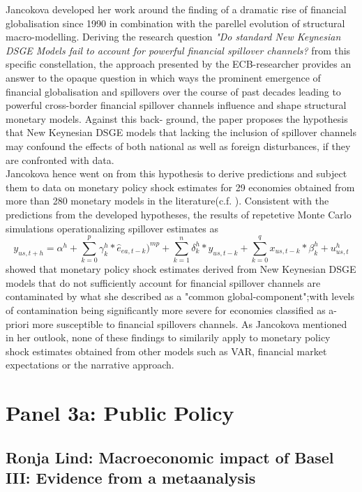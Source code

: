 \documentclass[a4paper,man,natbib]{apa6}
\begin{document}
Jancokova developed her work around the finding of a dramatic rise of financial globalisation since 1990 in combination with the parellel evolution of structural macro-modelling. Deriving the research question \textit{"Do standard New Keynesian DSGE Models fail to account for powerful financial spillover channels?} from this specific constellation, the approach presented by the ECB-researcher provides an answer to the opaque question in which ways the prominent emergence of financial globalisation and spillovers over the course of past decades leading to powerful cross-border financial spillover channels influence and shape structural monetary models. Against this back- ground, the paper proposes the hypothesis that New Keynesian DSGE models that lacking the inclusion of spillover channels may confound the effects of both national as well as foreign disturbances, if they are confronted with data. \\
Jancokova hence went on from this hypothesis to derive predictions and subject them to data on monetary policy shock estimates for 29 economies obtained from more than 280 monetary models in the literature(c.f. \cite{Georgiadis2017}). Consistent with the predictions from the developed hypotheses, the results of repetetive Monte Carlo simulations operationalizing spillover estimates as 
\begin{equation}
y_{us,t+h}  = \alpha^h + \sum_{k = 0}^{p}\gamma_k^h*\hat{e}_{ea,t-k})^{mp} + \sum_{k = 1}^{n}\delta_k^h*y_{us,t-k} +
\sum_{k = 0}^{q} x_{us,t-k}*\beta_{k}^{h} + u_{us,t}^{h}
\end{equation}
showed that monetary policy shock estimates derived from New Keynesian DSGE models that do not sufficiently account for financial spillover channels are contaminated by what she described as a "common global-component";with levels of contamination being significantly more severe for economies classified as a-priori more susceptible to financial spillovers channels. As Jancokova mentioned in her outlook, none of these findings to similarily apply to monetary policy shock estimates obtained from other models such as VAR, financial market expectations or the narrative approach.


\section{Panel 3a: Public Policy}
\subsection{Ronja Lind: Macroeconomic impact of Basel III: Evidence from a metaanalysis}
\end{document}
